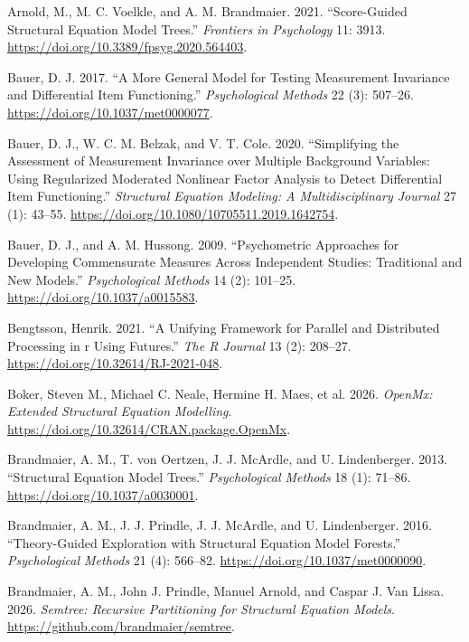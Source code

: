 \documentclass[
  man,
  floatsintext]{apa7}
\newlength{\cslhangindent}
\newenvironment{CSLReferences}[2] %
 {\begin{list}{}{%
  \setlength{\itemindent}{0pt}
  \setlength{\leftmargin}{0pt}
  \setlength{\parsep}{0pt}
  \ifodd #1
   \setlength{\leftmargin}{\cslhangindent}
   \setlength{\itemindent}{-1\cslhangindent}
  \fi
  \setlength{\itemsep}{#2\baselineskip}}}
 {\end{list}}
\begin{document}
\protect{}\label{refs}
\begin{CSLReferences}{1}{1}
Arnold, M., M. C. Voelkle, and A. M. Brandmaier. 2021. {``Score-Guided
Structural Equation Model Trees.''} \emph{Frontiers in Psychology} 11:
3913. \url{https://doi.org/10.3389/fpsyg.2020.564403}.

Bauer, D. J. 2017. {``A More General Model for Testing Measurement
Invariance and Differential Item Functioning.''} \emph{Psychological
Methods} 22 (3): 507--26. \url{https://doi.org/10.1037/met0000077}.

Bauer, D. J., W. C. M. Belzak, and V. T. Cole. 2020. {``Simplifying the
Assessment of Measurement Invariance over Multiple Background Variables:
Using Regularized Moderated Nonlinear Factor Analysis to Detect
Differential Item Functioning.''} \emph{Structural Equation Modeling: A
Multidisciplinary Journal} 27 (1): 43--55.
\url{https://doi.org/10.1080/10705511.2019.1642754}.

Bauer, D. J., and A. M. Hussong. 2009. {``Psychometric Approaches for
Developing Commensurate Measures Across Independent Studies: Traditional
and New Models.''} \emph{Psychological Methods} 14 (2): 101--25.
\url{https://doi.org/10.1037/a0015583}.

Bengtsson, Henrik. 2021. {``A Unifying Framework for Parallel and
Distributed Processing in r Using Futures.''} \emph{The R Journal} 13
(2): 208--27. \url{https://doi.org/10.32614/RJ-2021-048}.

Boker, Steven M., Michael C. Neale, Hermine H. Maes, et al. 2026.
\emph{OpenMx: Extended Structural Equation Modelling}.
\url{https://doi.org/10.32614/CRAN.package.OpenMx}.

Brandmaier, A. M., T. von Oertzen, J. J. McArdle, and U. Lindenberger.
2013. {``Structural Equation Model Trees.''} \emph{Psychological
Methods} 18 (1): 71--86. \url{https://doi.org/10.1037/a0030001}.

Brandmaier, A. M., J. J. Prindle, J. J. McArdle, and U. Lindenberger.
2016. {``Theory-Guided Exploration with Structural Equation Model
Forests.''} \emph{Psychological Methods} 21 (4): 566--82.
\url{https://doi.org/10.1037/met0000090}.

Brandmaier, A. M., John J. Prindle, Manuel Arnold, and Caspar J. Van
Lissa. 2026. \emph{Semtree: Recursive Partitioning for Structural
Equation Models}. \url{https://github.com/brandmaier/semtree}.


\end{CSLReferences}
\end{document}
